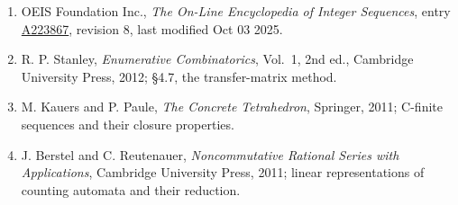 \documentclass[11pt]{article}
\theoremstyle{definition}
\begin{document}
\begin{enumerate}

\item OEIS Foundation Inc., \emph{The On-Line Encyclopedia of Integer Sequences}, entry \href{https://oeis.org/A223867}{A223867}, revision 8, last modified Oct 03 2025.

\item R. P. Stanley, \emph{Enumerative Combinatorics}, Vol.~1, 2nd ed., Cambridge University Press, 2012; \S4.7, the transfer-matrix method.

\item M. Kauers and P. Paule, \emph{The Concrete Tetrahedron}, Springer, 2011; C-finite sequences and their closure properties.

\item J. Berstel and C. Reutenauer, \emph{Noncommutative Rational Series with Applications}, Cambridge University Press, 2011; linear representations of counting automata and their reduction.

\end{enumerate}
\end{document}
